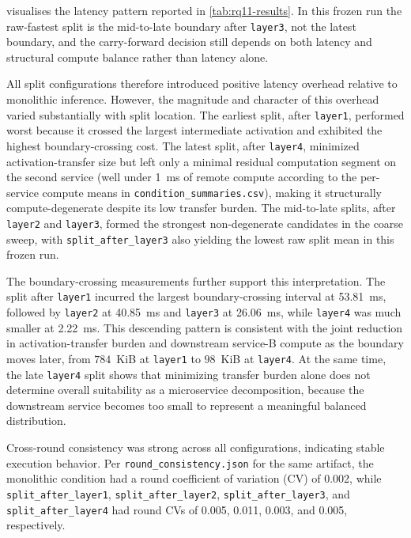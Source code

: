  visualises the latency pattern reported in
\cref{tab:rq11-results}. In this frozen run the raw-fastest split is the
mid-to-late boundary after \texttt{layer3}, not the latest boundary, and the
carry-forward decision still depends on both latency and structural compute
balance rather than latency alone.

All split configurations therefore introduced positive latency overhead relative to monolithic inference. However, the magnitude and character of this overhead varied substantially with split location. The earliest split, after \texttt{layer1}, performed worst because it crossed the largest intermediate activation and exhibited the highest boundary-crossing cost. The latest split, after \texttt{layer4}, minimized activation-transfer size but left only a minimal residual computation segment on the second service (well under 1~ms of remote compute according to the per-service compute means in \texttt{condition\_summaries.csv}), making it structurally compute-degenerate despite its low transfer burden. The mid-to-late splits, after \texttt{layer2} and \texttt{layer3}, formed the strongest non-degenerate candidates in the coarse sweep, with \texttt{split\_after\_layer3} also yielding the lowest raw split mean in this frozen run.

The boundary-crossing measurements further support this interpretation. The split after \texttt{layer1} incurred the largest boundary-crossing interval at 53.81~ms, followed by \texttt{layer2} at 40.85~ms and \texttt{layer3} at 26.06~ms, while \texttt{layer4} was much smaller at 2.22~ms. This descending pattern is consistent with the joint reduction in activation-transfer burden and downstream service-B compute as the boundary moves later, from $784$~KiB at \texttt{layer1} to $98$~KiB at \texttt{layer4}. At the same time, the late \texttt{layer4} split shows that minimizing transfer burden alone does not determine overall suitability as a microservice decomposition, because the downstream service becomes too small to represent a meaningful balanced distribution.

Cross-round consistency was strong across all configurations, indicating stable execution behavior. Per \texttt{round\_consistency.json} for the same artifact, the monolithic condition had a round coefficient of variation (CV) of 0.002, while \texttt{split\_after\_layer1}, \texttt{split\_after\_layer2}, \texttt{split\_after\_layer3}, and \texttt{split\_after\_layer4} had round CVs of 0.005, 0.011, 0.003, and 0.005, respectively.

